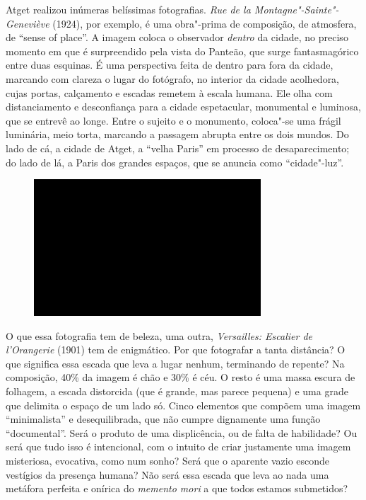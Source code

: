 Atget realizou inúmeras belíssimas fotografias. \emph{Rue de la
Montagne"-Sainte"-Geneviève} (1924), por exemplo, é uma obra"-prima de
composição, de atmosfera, de ``sense of place''. A imagem coloca o
observador \emph{dentro} da cidade, no preciso momento em que é
surpreendido pela vista do Panteão, que surge fantasmagórico entre duas
esquinas. É uma perspectiva feita de dentro para fora da cidade,
marcando com clareza o lugar do fotógrafo, no interior da cidade
acolhedora, cujas portas, calçamento e escadas remetem à escala humana.
Ele olha com distanciamento e desconfiança para a cidade espetacular,
monumental e luminosa, que se entrevê ao longe. Entre o sujeito e o
monumento, coloca"-se uma frágil luminária, meio torta, marcando a
passagem abrupta entre os dois mundos. Do lado de cá, a cidade de Atget,
a ``velha Paris'' em processo de desaparecimento; do lado de lá, a Paris
dos grandes espaços, que se anuncia como ``cidade"-luz''.

\begin{figure}[!ht]

\centering
 \includegraphics[width=85mm]{./imgs/im1.jpg}
\caption{\tiny{}}

\end{figure}

O que essa fotografia tem de beleza, uma outra, \emph{Versailles:
Escalier de l'Orangerie} (1901) tem de enigmático. Por que fotografar a
tanta distância? O que significa essa escada que leva a lugar nenhum,
terminando de repente? Na composição, 40\% da imagem é chão e 30\% é
céu. O resto é uma massa escura de folhagem, a escada distorcida (que é
grande, mas parece pequena) e uma grade que delimita o espaço de um lado
só. Cinco elementos que compõem uma imagem ``minimalista'' e
desequilibrada, que não cumpre dignamente uma função ``documental''.
Será o produto de uma displicência, ou de falta de habilidade? Ou será
que tudo isso é intencional, com o intuito de criar justamente uma
imagem misteriosa, evocativa, como num sonho? Será que o aparente vazio
esconde vestígios da presença humana? Não será essa escada que leva ao
nada uma metáfora perfeita e onírica do \emph{memento mori} a que todos
estamos submetidos?

